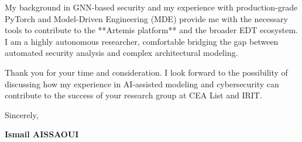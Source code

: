 \documentclass[a4paper,12pt]{article}
\begin{document}
My background in GNN-based security and my experience with production-grade PyTorch and Model-Driven Engineering (MDE) provide me with the necessary tools to contribute to the **Artemis platform** and the broader EDT ecosystem. I am a highly autonomous researcher, comfortable bridging the gap between automated security analysis and complex architectural modeling.

Thank you for your time and consideration. I look forward to the possibility of discussing how my experience in AI-assisted modeling and cybersecurity can contribute to the success of your research group at CEA List and IRIT.

Sincerely,

\bigskip

\textbf{Ismail AISSAOUI}
\end{document}
